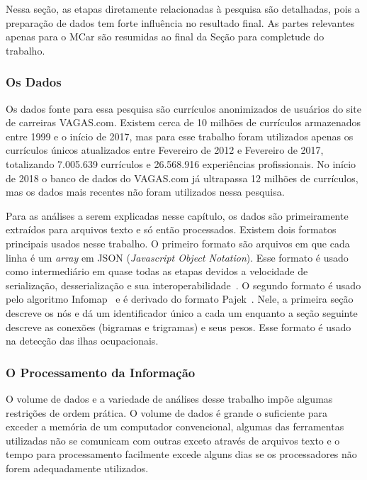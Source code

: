 \documentclass[12pt,a4paper]{article}
\begin{document}
Nessa seção, as etapas diretamente relacionadas à pesquisa são detalhadas, pois a preparação de dados tem forte influência no resultado final. As partes relevantes apenas para o MCar são resumidas ao final da Seção para completude do trabalho.


\subsubsection{Os Dados}

Os dados fonte para essa pesquisa são currículos anonimizados de usuários do site de carreiras VAGAS.com. Existem cerca de 10 milhões de currículos armazenados entre 1999 e o início de 2017, mas para esse trabalho foram utilizados apenas os currículos únicos atualizados entre Fevereiro de 2012 e Fevereiro de 2017, totalizando 7.005.639 currículos e 26.568.916 experiências profissionais. No início de 2018 o banco de dados do VAGAS.com já ultrapassa 12 milhões de currículos, mas os dados mais recentes não foram utilizados nessa pesquisa.

Para as análises a serem explicadas nesse capítulo, os dados são primeiramente extraídos para arquivos texto e só então processados. Existem dois formatos principais usados nesse trabalho. O primeiro formato são arquivos em que cada linha é um \textit{array} em JSON (\textit{Javascript Object Notation}). Esse formato é usado como intermediário em quase todas as etapas devidos a velocidade de serialização, desserialização e sua interoperabilidade~\cite{Maeda2012-co}. O segundo formato é usado pelo algoritmo Infomap~\cite{Edler2012-hh} e é derivado do formato Pajek~\cite{Batagelj2002-ly}. Nele, a primeira seção descreve os nós e dá um identificador único a cada um enquanto a seção seguinte descreve as conexões (bigramas e trigramas) e seus pesos. Esse formato é usado na detecção das ilhas ocupacionais.


\subsubsection{O Processamento da Informação}

O volume de dados e a variedade de análises desse trabalho impõe algumas restrições de ordem prática. O volume de dados é grande o suficiente para exceder a memória de um computador convencional, algumas das ferramentas utilizadas não se comunicam com outras exceto através de arquivos texto e o tempo para processamento facilmente excede alguns dias se os processadores não forem adequadamente utilizados.
\end{document}

